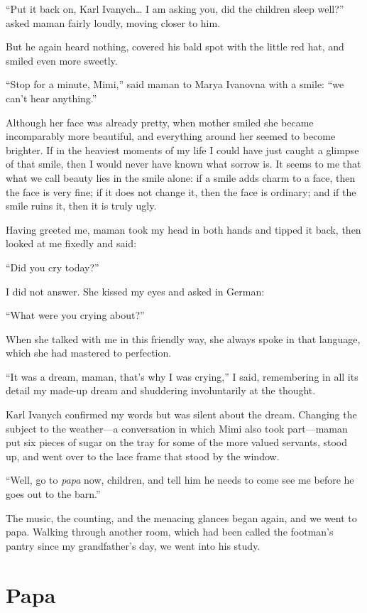``Put it back on, Karl Ivanych\ldots{} I am asking you, did the children sleep well?'' asked maman fairly loudly, moving closer to him. %

But he again heard nothing, covered his bald spot with the little red hat, and smiled even more sweetly.

``Stop for a minute, Mimi,'' said maman to Marya Ivanovna with a smile: ``we can't hear anything.'' %

Although her face was already pretty, when mother smiled she became incomparably more beautiful, and everything around her seemed to become brighter. If in the heaviest moments of my life I could have just caught a glimpse of that smile, then I would never have known what sorrow is. It seems to me that what we call beauty lies in the smile alone: if a smile adds charm to a face, then the face is very fine; if it does not change it, then the face is ordinary; and if the smile ruins it, then it is truly ugly.

Having greeted me, maman took my head in both hands and tipped it back, then looked at me fixedly and said:

``Did you cry today?'' %

I did not answer. She kissed my eyes and asked in German:

``What were you crying about?'' %

When she talked with me in this friendly way, she always spoke in that language, which she had mastered to perfection.

``It was a dream, maman, that's why I was crying,'' I said, remembering in all its detail my made-up dream and shuddering involuntarily at the thought. %

Karl Ivanych confirmed my words but was silent about the dream. Changing the subject to the weather---a conversation in which Mimi also took part---maman put six pieces of sugar on the tray for some of the more valued servants, stood up, and went over to the lace frame that stood by the window.

``Well, go to \textit{papa} now, children, and tell him he needs to come see me before he goes out to the barn.'' %

The music, the counting, and the menacing glances began again, and we went to papa. Walking through another room, which had been called the footman's pantry since my grandfather's day, we went into his study.

\chapter{Papa} %


